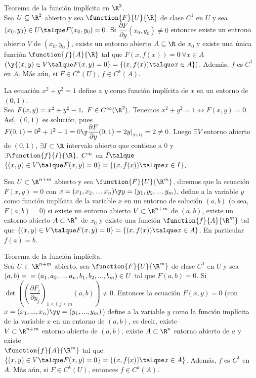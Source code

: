 	\begin{teor} Teorema de la función implícita en $\R^2$.\\
Sea $U\subseteq \R^2$ abierto y sea $\function{F}{U}{\R}$ de clase $C^1$ en $U$ y sea $(x_0,y_0)\in U\talque F(x_0,y_0)=0$. Si $\dfrac{\partial F}{\partial y}(x_0,y_0)\neq 0$ entonces existe un entrono abierto $V$ de $(x_0,y_0)$, existe un entorno abierto $A\subseteq\R$ de $x_0$ y existe una única función $\function{f}{A}{\R}$ tal que $F(x,f(x))=0\ \forall x\in A$ $(\y \{(x,y)\in V\talque F(x,y)=0\}=\{(x,f(x))\talque x\in A\})$. Además, $f$ es $C^1$ en $A$. Más aún, si $F\in C^k(U)$, $f\in C^k(A)$.
\end{teor}

\begin{ejem} La ecuación $x^2+y^2=1$ define a $y$ como función implícita de $x$ en un entorno de $(0,1)$.\\
Sea $F(x,y)=x^2+y^2-1,\ F\in C^\infty(\R^2)$. Tenemos $x^2+y^2=1\iff F(x,y)=0$.\\
Así, $(0,1)$ es solución, pues $F(0,1)=0^2+1^2-1=0\y \dfrac{\partial F}{\partial y}(0,1)=2y|_{_{(0,1)}}=2\neq 0$. Luego $\exists V$ entorno abierto de $(0,1)$, $\exists I\subset\R$ intervalo abierto que contiene a $0$ y $\exists\function{f}{I}{\R},\ C^\infty$ en $I\talque$ $\{(x,y)\in V\talque F(x,y)=0\}=\{(x,f(x))\talque x\in I\}$.
\end{ejem}

\begin{defi} Sea $U\subset\R^{n+m}$ abierto y sea $\function{F}{U}{\R^m}$, diremos que la ecuación $F(x,y)=0$ con $x=(x_1,x_2,...,x_n)\y y=(y_1,y_2,...,y_m)$, define a la variable $y$ como función implícita de la variable $x$ en un entorno de solución $(a,b)$ (o sea, $F(a,b)=0$) si existe un entorno abierto $V\subset\R^{n+m}$ de $(a,b)$, existe un entorno abierto $A\subset\R^n$ de $x_0$ y existe una función $\function{f}{A}{\R^m}$ tal que $\{(x,y)\in V\talque F(x,y)=0\}=\{(x,f(x))\talque x\in A\}$. En particular $f(a)=b$.
\end{defi}

\begin{teor}Teorema de la función implícita.\\
Sea $U\subset\R^{n+m}$ abierto, sea $\function{F}{U}{\R^m}$ de clase $C^1$ en $U$ y sea $(a,b)=\\=(a_1,a_2,...,a_n,b_1,b_2,...,b_m)\in U$ tal que $F(a,b)=0$. Si $\det\left(\left(\dfrac{\partial F_i}{\partial y_j}\right)_{1\leq i,j\leq m}(a,b)\right)\neq 0$. Entonces la ecuación $F(x,y)=0$ (con $x=(x_1,...,x_n)\y y=(y_1,...,y_m)$) define a la variable $y$ como la función implícita de la variable $x$ en un entorno de $(a,b)$, es decir, existe\\
$V\subset\R^{n+m}$ entorno abierto de $(a,b)$, existe $A\subset\R^n$ entorno abierto de $a$ y existe \\
$\function{f}{A}{\R^m}$ tal que $\{(x,y)\in V\talque F(x,y)=0\}=\{(x,f(x))\talque x\in A\}$. Además, $f$ es $C^1$ en $A$. Más aún, si $F\in C^k(U)$, entonces $f\in C^k(A)$.
\end{teor}

